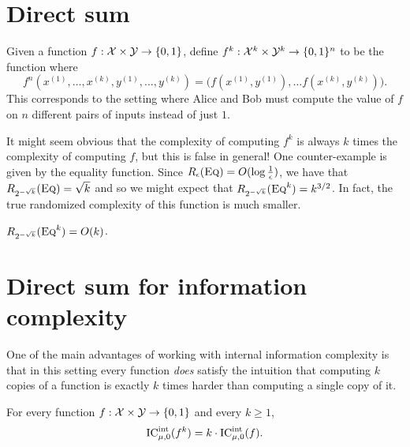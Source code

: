 \section{Direct sum}

Given a function $f : \mathcal{X} \times \mathcal{Y} \to \{0,1\}$, define $f^k : \mathcal{X}^k \times \mathcal{Y}^k \to \{0,1\}^n$ to be the function where
\[
f^n(x^{(1)},\ldots,x^{(k)},y^{(1)},\ldots,y^{(k)}) = \big( f(x^{(1)},y^{(1)}), \ldots f(x^{(k)}, y^{(k)})\big).
\]
This corresponds to the setting where Alice and Bob must compute the value of $f$ on $n$ different pairs of inputs instead of just $1$.

It might seem obvious that the complexity of computing $f^k$ is always $k$ times the complexity of computing $f$, but this is false in general! One counter-example is given by the equality function. Since $R_\epsilon(\textsc{Eq}) = O(\log \frac1\epsilon)$, we have that $R_{2^{-\sqrt{k}}}(\textsc{Eq}) = \sqrt{k}$ and so we might expect that $R_{2^{-\sqrt{k}}}(\textsc{Eq}^k) = k^{3/2}$. In fact, the true randomized complexity of this function is much smaller.

\begin{theorem}
	$R_{2^{-\sqrt{k}}}(\textsc{Eq}^k) = O(k)$.
\end{theorem}


\section{Direct sum for information complexity}

One of the main advantages of working with internal information complexity is that in this setting every function \emph{does} satisfy the intuition that computing $k$ copies of a function is exactly $k$ times harder than computing a single copy of it.
\begin{theorem}
	For every function $f : \mathcal{X} \times \mathcal{Y} \to \{0,1\}$ and every $k \ge 1$,
	\[
	\mathrm{IC}^{\mathrm{int}}_{\mu,0}(f^k) = k \cdot \mathrm{IC}^{\mathrm{int}}_{\mu,0}(f).
	\]
\end{theorem}


